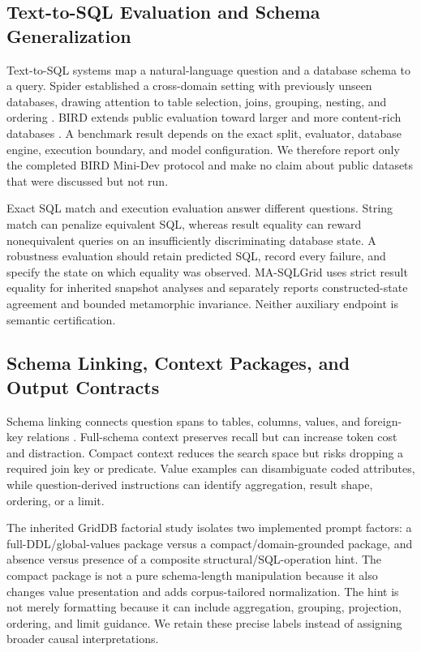 \documentclass[applsci,article,submit,moreauthors]{Definitions/mdpi}
\newcommand{\masql}{MA-SQLGrid}
\begin{document}
\subsection{Text-to-SQL Evaluation and Schema Generalization}

Text-to-SQL systems map a natural-language question and a database schema to a query. Spider established a cross-domain setting with previously unseen databases, drawing attention to table selection, joins, grouping, nesting, and ordering \cite{yu2018spider}. BIRD extends public evaluation toward larger and more content-rich databases \cite{li2023bird}. A benchmark result depends on the exact split, evaluator, database engine, execution boundary, and model configuration. We therefore report only the completed BIRD Mini-Dev protocol and make no claim about public datasets that were discussed but not run.

Exact SQL match and execution evaluation answer different questions. String match can penalize equivalent SQL, whereas result equality can reward nonequivalent queries on an insufficiently discriminating database state. A robustness evaluation should retain predicted SQL, record every failure, and specify the state on which equality was observed. \masql{} uses strict result equality for inherited snapshot analyses and separately reports constructed-state agreement and bounded metamorphic invariance. Neither auxiliary endpoint is semantic certification.

\subsection{Schema Linking, Context Packages, and Output Contracts}

Schema linking connects question spans to tables, columns, values, and foreign-key relations \cite{wang2020ratsql,lei2020reexamining,liu2022semantic}. Full-schema context preserves recall but can increase token cost and distraction. Compact context reduces the search space but risks dropping a required join key or predicate. Value examples can disambiguate coded attributes, while question-derived instructions can identify aggregation, result shape, ordering, or a limit.

The inherited GridDB factorial study isolates two implemented prompt factors: a full-DDL/global-values package versus a compact/domain-grounded package, and absence versus presence of a composite structural/SQL-operation hint. The compact package is not a pure schema-length manipulation because it also changes value presentation and adds corpus-tailored normalization. The hint is not merely formatting because it can include aggregation, grouping, projection, ordering, and limit guidance. We retain these precise labels instead of assigning broader causal interpretations.
\end{document}
